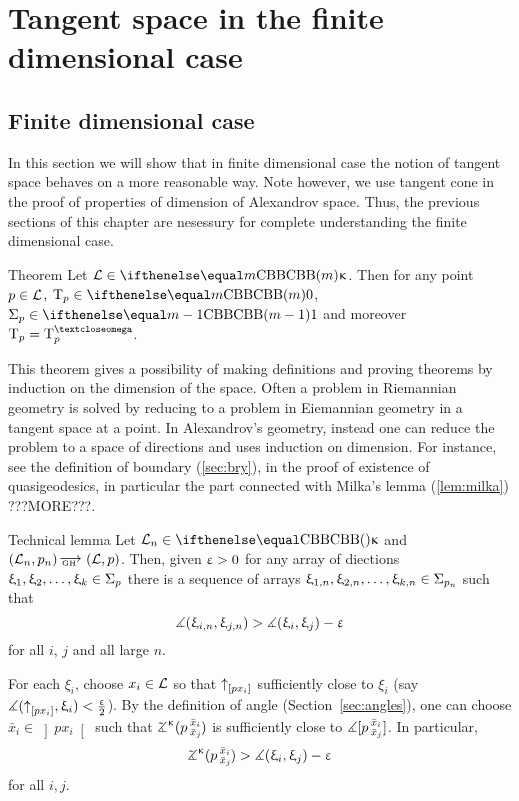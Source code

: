 
\chapter{Tangent space in the finite dimensional case}

\section{Finite dimensional case}

In this section we will show that in finite dimensional case the notion of tangent space behaves on a more reasonable way.
Note however, 
we use tangent cone in the proof of properties of dimension of Alexandrov space.
Thus, the previous sections of this chapter are nesessury for complete understanding the finite dimensional case.

\begin{thm}{Theorem}\label{thm:tan4finite} 
Let $\spc{L}\in \Alex m\kappa$. 
Then for any point $p\in \spc{L}$, 
$\T_p\in\Alex m0$, $\Sigma_p\in\Alex{m-1}1$ and moreover $\T_p=\T^\o_p$.
\end{thm}


This theorem gives a possibility of making definitions and proving theorems by induction on the dimension of the space.
Often a problem in Riemannian geometry is solved by 
reducing to a problem in Eiemannian geometry 
in a tangent space at a point.
In Alexandrov's geometry, instead one can reduce the problem 
to a space of directions and uses induction on dimension. 
For instance, see the  
definition of boundary (\ref{sec:bry}), 
in the proof of existence of quasigeodesics, in particular the part connected with Milka's lemma (\ref{lem:milka}) ???MORE???.

\begin{thm}{Technical lemma}\label{lem:tan-tech}
Let $\spc{L}_n\in \Alex{}{\kappa}$ and $(\spc{L}_n,p_n)\GHto(\spc{L},p)$.
Then, given $\upvarepsilon>0$ for any array of diections $\xi_1,\xi_2,\dots,\xi_\kay\in\Sigma_p$
there is a sequence of  arrays $\xi_{1,n},\xi_{2,n},\dots,\xi_{\kay,n}\in\Sigma_{p_n}$
such that \[\measuredangle(\upxi_{i,n},\upxi_{j,n})>\measuredangle(\upxi_i,\upxi_j)-\upvarepsilon\]
for all $i$, $j$ and all large $n$.
\end{thm}

For each $\xi_i$, choose $x_i\in \spc{L}$ so that ${\uparrow}_{[{p}{x_i}]}$ sufficiently close to $\xi_i$ 
(say $\measuredangle({\uparrow}_{[{p}{x_i}]},\upxi_i)<\tfrac{\upvarepsilon}2$).
By the definition of angle (Section~\ref{sec:angles}), 
one can choose $\bar x_i\in\left]px_i\right[$ such that
$\angk{\kappa}{p}{\bar x_i}{\bar x_j}$ is sufficiently close to $\measuredangle[p\,{}^{\bar x_i}_{\bar x_j}]$.
In particular,
\[\angk{\kappa}{p}{\bar x_i}{\bar x_j}>\mangle(\xi_i,\xi_j)-\eps\] 
for all $i,j$.

